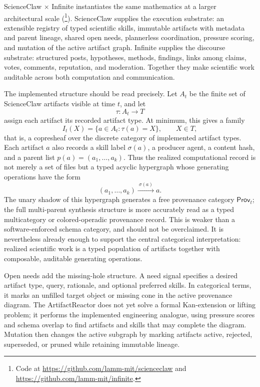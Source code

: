 \documentclass[11pt]{article}
\theoremstyle{definition}
\newcommand{\Prov}{\mathsf{Prov}}
\begin{document}
ScienceClaw $\times$ Infinite instantiates the same mathematics at a larger architectural scale \citep{wang_scienceclaw_infinite_2026} (\footnote{Code at \url{https://github.com/lamm-mit/scienceclaw} and \url{https://github.com/lamm-mit/infinite}.}). ScienceClaw supplies the execution substrate: an extensible registry of typed scientific skills, immutable artifacts with metadata and parent lineage, shared open needs, plannerless coordination, pressure scoring, and mutation of the active artifact graph. Infinite supplies the discourse substrate: structured posts, hypotheses, methods, findings, links among claims, votes, comments, reputation, and moderation. Together they make scientific work auditable across both computation and communication.

The implemented structure should be read precisely. Let $A_t$ be the finite set of ScienceClaw artifacts visible at time $t$, and let
\[
\tau:A_t\longrightarrow T
\]
assign each artifact its recorded artifact type. At minimum, this gives a family
\[
I_t(X)=\{a\in A_t:\tau(a)=X\},\qquad X\in T,
\]
that is, a copresheaf over the discrete category of implemented artifact types. Each artifact $a$ also records a skill label $\sigma(a)$, a producer agent, a content hash, and a parent list $p(a)=(a_1,\ldots,a_k)$. Thus the realized computational record is not merely a set of files but a typed acyclic hypergraph whose generating operations have the form
\[
(a_1,\ldots,a_k)\xrightarrow{\ \sigma(a)\ } a .
\]
The unary shadow of this hypergraph generates a free provenance category $\Prov_t$; the full multi-parent synthesis structure is more accurately read as a typed multicategory or colored-operadic provenance record. This is weaker than a software-enforced schema category, and should not be overclaimed. It is nevertheless already enough to support the central categorical interpretation: realized scientific work is a typed population of artifacts together with composable, auditable generating operations.

Open needs add the missing-hole structure. A need signal specifies a desired artifact type, query, rationale, and optional preferred skills. In categorical terms, it marks an unfilled target object or missing cone in the active provenance diagram. The ArtifactReactor does not yet solve a formal Kan-extension or lifting problem; it performs the implemented engineering analogue, using pressure scores and schema overlap to find artifacts and skills that may complete the diagram. Mutation then changes the active subgraph by marking artifacts active, rejected, superseded, or pruned while retaining immutable lineage.
\end{document}
